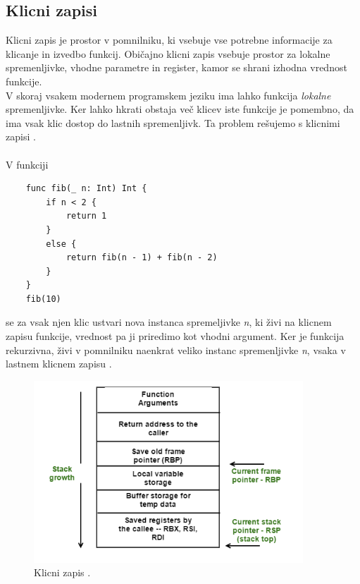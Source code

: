 \documentclass[a4paper, 12p]{book}
\begin{document}
\subsection{Klicni zapisi}

Klicni zapis je prostor v pomnilniku, ki vsebuje vse potrebne informacije za klicanje in izvedbo funkcij. Običajno klicni zapis vsebuje prostor za lokalne spremenljivke, vhodne parametre in register, kamor se shrani izhodna vrednost funkcije. \\
\indent V skoraj vsakem modernem programskem jeziku ima lahko funkcija \textit{lokalne} spremenljivke. Ker lahko hkrati obstaja več klicev iste funkcije je pomembno, da ima vsak klic dostop do lastnih spremenljivk. Ta problem rešujemo s klicnimi zapisi \cite{modernCompiler}.  \\\\
\indent V funkciji 

\renewcommand{\lstlistingname}{Program}
\begin{lstlisting}
	func fib(_ n: Int) Int {
	    if n < 2 {
	        return 1
	    }
	    else {
	        return fib(n - 1) + fib(n - 2)
	    }
	}
	fib(10)
\end{lstlisting}

se za vsak njen klic ustvari nova instanca spremeljivke \textit{n}, ki živi na klicnem zapisu funkcije, vrednost pa ji priredimo kot vhodni argument. Ker je funkcija rekurzivna, živi v pomnilniku naenkrat veliko instanc spremenljivke \textit{n}, vsaka v lastnem klicnem zapisu \cite{modernCompiler}.

\begin{figure}[h]
	\begin{center}
		\includegraphics[width=0.9\textwidth]{resources/stackFrame.png}
	\end{center}
	\caption{Klicni zapis \cite{stackFrames}.}
	\label{image:stackFramesImg}
\end{figure}
\end{document}
